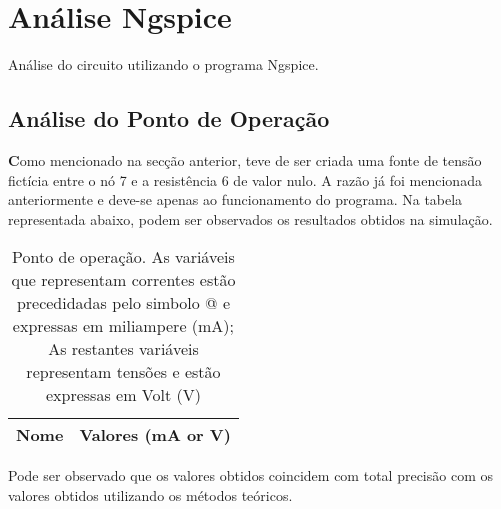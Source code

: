 \section{Análise Ngspice}
\label{sec:simulacao}
Análise do circuito utilizando o programa Ngspice.
\subsection{Análise do Ponto de Operação}
\textbf Como mencionado na secção anterior, teve de ser criada uma fonte de tensão fictícia entre o nó 7 e a resistência 6 de valor nulo. A razão já foi mencionada anteriormente e deve-se apenas ao funcionamento do programa. Na tabela representada abaixo, podem ser observados os resultados obtidos na simulação.

\begin{table}[h]
  \centering
  \begin{tabular}{|l|r|}
    \hline    
    {\bf Nome} & {\bf Valores (mA or V)} \\ \hline
    
  \end{tabular}
  \caption{Ponto de operação. As variáveis que representam correntes estão precedidadas pelo simbolo @ e expressas em miliampere (mA); As restantes variáveis representam tensões e estão expressas em Volt (V)}
  \label{tab:op}
\end{table}

Pode ser observado que os valores obtidos coincidem com total precisão com os valores obtidos utilizando os métodos teóricos.
